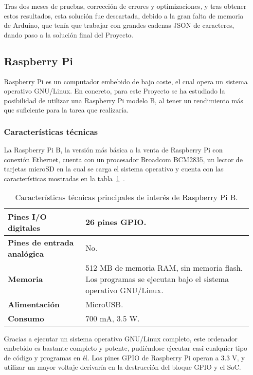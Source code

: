         Tras dos meses de pruebas, corrección de errores y optimizaciones, y tras obtener estos resultados, esta solución fue descartada, debido a la gran falta de memoria de Arduino, que tenía que trabajar con grandes cadenas JSON de caracteres, dando paso a la solución final del Proyecto.

    \subsection{Raspberry Pi}
        Raspberry Pi es un computador embebido de bajo coste, el cual opera un sistema operativo GNU/Linux. En concreto, para este Proyecto se ha estudiado la posibilidad de utilizar una Raspberry Pi modelo B, al tener un rendimiento más que suficiente para la tarea que realizaría.

        \subsubsection{Características técnicas}
        La Raspberry Pi B, la versión más básica a la venta de Raspberry Pi con conexión Ethernet, cuenta con un procesador Broadcom BCM2835, un lector de tarjetas microSD en la cual se carga el sistema operativo y cuenta con las características mostradas en la tabla~\ref{tab:raspberry}~\cite{raspberrypidocs}.

         \begin{table}[!ht]
            \centering
            {
            \begin{tabularx}{\textwidth}{|l|X|}
                \hline
                \textbf{Pines I/O digitales} & 26 pines GPIO. \\ \hline
                \textbf{Pines de entrada analógica} & No. \\ \hline
                \textbf{Memoria} & 512 MB de memoria RAM, sin memoria flash. Los programas se ejecutan bajo el sistema operativo GNU/Linux. \\ \hline
                \textbf{Alimentación} & MicroUSB. \\ \hline
                \textbf{Consumo} & 700 mA, 3.5 W. \\ \hline
            \end{tabularx}
            }
            \caption{Características técnicas principales de interés de Raspberry Pi B.}
            \label{tab:raspberry}
        \end{table}

        Gracias a ejecutar un sistema operativo GNU/Linux completo, este ordenador embebido es bastante completo y potente, pudiéndose ejecutar casi cualquier tipo de código y programas en él. Los pines GPIO de Raspberry Pi operan a 3.3 V, y utilizar un mayor voltaje derivaría en la destrucción del bloque GPIO y el SoC.

